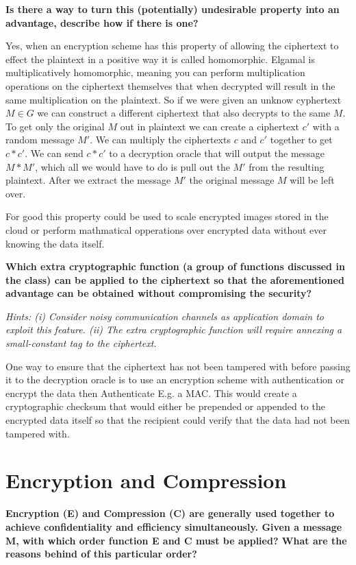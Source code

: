 \documentclass[letterpaper,11pt,notitlepage,fleqn]{article}
\begin{document}
\noindent \textbf{Is  there  a  way  to  turn  this  (potentially)  undesirable  property  into  an  advantage, describe how if there is one?}

Yes, when an encryption scheme has this property of allowing the ciphertext to effect the plaintext in a positive way it is called homomorphic. Elgamal is multiplicatively homomorphic, meaning you can perform multiplication operations on the ciphertext themselves that when decrypted will result in the same multiplication on the plaintext. So if we were given an unknow cyphertext $M \in G$ we can construct a different ciphertext that also decrypts to the same $M$. To get only the original
$M$ out in plaintext we can create a ciphertext $c'$ with a random message $M'$. We can multiply the ciphertexts $c$ and
$c'$ together to get $c*c'$. We can send $c*c'$ to a decryption oracle that will output the message $M*M'$, which all we would have to do is pull out the $M'$ from the resulting plaintext. After we extract the message $M'$ the original message $M$ will be left over. 

For good this property could be used to scale encrypted images stored in the cloud or perform mathmatical opperations over encrypted data without ever knowing the data itself. 

\noindent \textbf{Which  extra  cryptographic  function  (a  group  of  functions  discussed  in  the  class)  can be applied to the ciphertext so that the aforementioned advantage can be obtained without compromising the security?}

\noindent \textit{Hints:  (i) Consider  noisy  communication  channels  as  application  domain  to  exploit  this  feature. 
(ii) The extra cryptographic function will require annexing a small-constant tag to the ciphertext.}

One way to ensure that the ciphertext has not been tampered with before passing it to the decryption oracle is to use an encryption scheme with authentication or encrypt the data then Authenticate E.g. a MAC. This would create a cryptographic checksum that would either be prepended or appended to the encrypted data itself so that the recipient could verify that the data had not been tampered with. 

\section{Encryption and Compression}
\noindent \textbf{Encryption (E) and Compression (C) are generally used together to achieve confidentiality and  efficiency  simultaneously. Given  a message M, with which order  function E  and C must be applied? What are the reasons behind of this particular order?}
\end{document}
